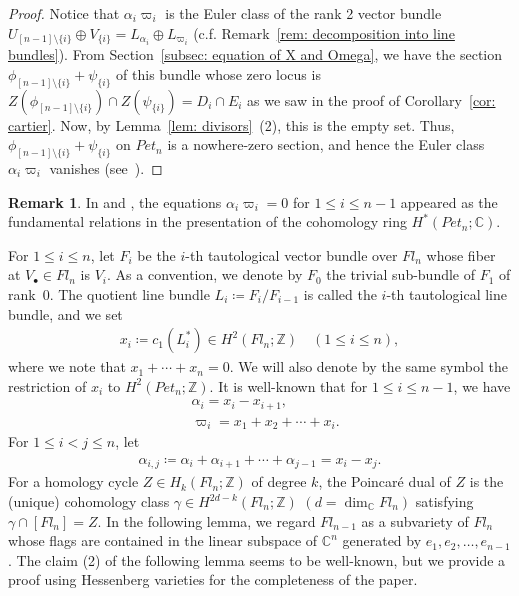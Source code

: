 \documentclass[11pt]{article}
\theoremstyle{definition}
\newtheorem{rema}[theo]{Remark}
\numberwithin{equation}{section}
\numberwithin{equation}{section}
\begin{document}
\begin{proof}
Notice that $\alpha_i \varpi_i$ is the Euler class of the rank 2 vector bundle $U_{[n-1]\setminus\{i\}}\oplus V_{\{i\}}=L_{\alpha_i}\oplus L_{\varpi_i}$ (c.f. Remark~\ref{rem: decomposition into line bundles}). From Section~\ref{subsec: equation of X and Omega}, we have the section $\phi_{[n-1]\setminus\{i\}}+\psi_{\{i\}}$ of this bundle whose zero locus is $Z(\phi_{[n-1]\setminus\{i\}})\cap Z(\psi_{\{i\}})=D_i\cap E_i$ as we saw in the proof of Corollary~\ref{cor: cartier}.
Now, by Lemma~\ref{lem: divisors}~(2), this is the empty set. Thus,~$\phi_{[n-1]\setminus\{i\}}+\psi_{\{i\}}$ on $Pet_{n}$ is a nowhere-zero section, and hence the Euler class $\alpha_i \varpi_i$ vanishes (see~\cite[Property 9.7]{Milnor-Stasheff}).
\end{proof}

\begin{rema}\label{rem: fundamental rel}
In \cite[Corollary~3.4]{fu-ha-ma} and \cite[Theorem 4.1]{ha-ho-ma}, the equations $\alpha_i \varpi_i = 0$ for $1\le i\le n-1$ appeared as the fundamental relations in the presentation of the cohomology ring $H^*(Pet_{n};{\mathbb C})$. 
\end{rema}

For $1\le i\le n$, let $F_i$ be the $i$-th tautological vector bundle over $Fl_n$ whose fiber at $V_{\bullet}\in Fl_n$ is $V_i$. As a convention, we denote by $F_0$ the trivial sub-bundle of $F_1$ of rank~$0$. The quotient line bundle $L_i\coloneqq F_i/F_{i-1}$ is called the $i$-th tautological line bundle, and we set 
\begin{align} \label{eq:xi}
x_i \coloneqq c_1(L_i^*) \in H^2(Fl_n;{\mathbb Z})
\quad (1\le i\le n),
\end{align}
where we note that $x_1+\cdots+x_n=0$. We will also denote by the same symbol the restriction of $x_i$ to $H^2(Pet_{n};{\mathbb Z})$. It is well-known that for $1\le i\le n-1$, we have 
\begin{equation}\label{eq: pi and x}
\begin{split}
&\alpha_i = x_i-x_{i+1}, \\
&\varpi_i = x_1+x_2+\cdots+x_i.
\end{split}
\end{equation}
For $1\le i<j\le n$, let
\begin{align*}
\alpha_{i,j}\coloneqq \alpha_i+\alpha_{i+1}+\cdots+\alpha_{j-1}=x_i-x_j.
\end{align*}
For a homology cycle $Z\in H_{k}(Fl_n;{\mathbb Z})$ of degree $k$, the Poincar\'{e} dual of $Z$ is the (unique) cohomology class $\gamma\in H^{2d-k}(Fl_n;{\mathbb Z})$ $(d=\dim_{{\mathbb C}}Fl_n)$ satisfying $\gamma\cap[Fl_n]=Z$. In the following lemma, we regard $Fl_{n-1}$ as a subvariety of $Fl_n$ whose flags are contained in the linear subspace of ${\mathbb C}^n$ generated by $e_1,e_2,\ldots,e_{n-1}$.
The claim (2) of the following lemma seems to be well-known, but we provide a proof using Hessenberg varieties for the completeness of the paper.
\end{document}
